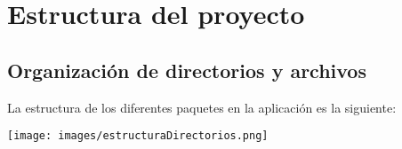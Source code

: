 \documentclass{article}
\begin{document}
\section{Estructura del proyecto}

    \subsection{Organización de directorios y archivos}

    La estructura de los diferentes paquetes en la aplicación es la siguiente:

    \begin{minipage}{1\textwidth}
        \centering
        \texttt{[image: images/estructuraDirectorios.png]}
    \end{minipage}
\end{document}
